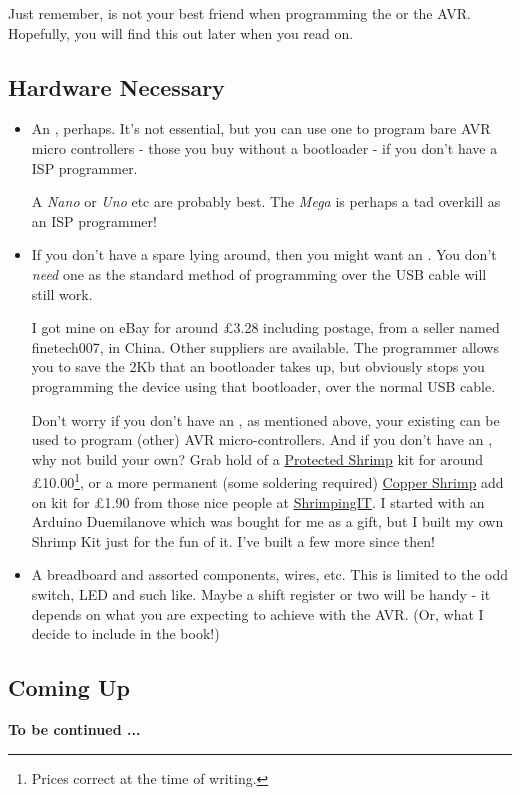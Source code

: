 Just remember,  is not your best friend when programming the   or the AVR. Hopefully, you will find this out later when you read on.

\subsection*{Hardware Necessary}\label{hardware-necessary}

\begin{itemize}
\item
  An  , perhaps. It's not essential, but you can use one to program bare AVR micro controllers - those you buy without a bootloader -   if you don't have a ISP programmer.
  
  A \emph{Nano} or \emph{Uno} etc are probably best. The \emph{Mega} is perhaps a tad overkill as an ISP programmer!
\item
  If you don't have a spare   lying around, then you might want an . You don't \emph{need} one as the standard   method of programming over the USB cable will still work.
  
  I got mine on eBay for around £3.28 including postage, from a seller named finetech007, in China. Other suppliers are available. The programmer allows you to save the 2Kb that an   bootloader takes up, but obviously stops you programming the device using that bootloader, over the normal USB cable.

  Don't worry if you don't have an , as mentioned above, your existing   can be used to program (other) AVR   micro-controllers. And if you don't have an  , why not build your own? Grab hold of a \href{http://start.shrimping.it/project/protected/build.html}{Protected Shrimp} kit for around £10.00\footnote{Prices correct at the time of writing.}, or a more permanent (some soldering required) \href{http://start.shrimping.it/kit/stripboard.html}{Copper Shrimp} add on kit for £1.90 from those nice people at \href{http://start.shrimping.it//index.html}{ShrimpingIT}. I started with an Arduino Duemilanove which was bought for me as a gift, but I built my own Shrimp Kit just for the fun of it. I've built a few more since then!
\item
  A breadboard and assorted components, wires, etc. This is limited to the odd switch, LED and such like. Maybe a shift register or two will be handy - it depends on what you are expecting to achieve with the   AVR. (Or, what I decide to include in the book!)
\end{itemize}

\subsection*{Coming Up}\label{coming-up}

\textbf{To be continued ...}
